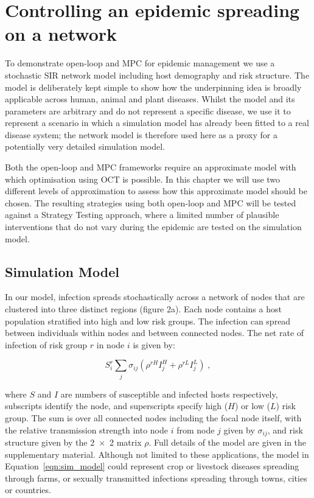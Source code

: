 \section{Controlling an epidemic spreading on a network}
\label{sec:ch4:Controlling}

To demonstrate open-loop and MPC for epidemic management we use a stochastic SIR network model including host demography and risk structure. The model is deliberately kept simple to show how the underpinning idea is broadly applicable across human, animal and plant diseases. Whilst the model and its parameters are arbitrary and do not represent a specific disease, we use it to represent a scenario in which a simulation model has already been fitted to a real disease system; the network model is therefore used here as a proxy for a potentially very detailed simulation model.

Both the open-loop and MPC frameworks require an approximate model with which optimisation using OCT is possible. In this chapter we will use two different levels of approximation to assess how this approximate model should be chosen. The resulting strategies using both open-loop and MPC will be tested against a Strategy Testing approach, where a limited number of plausible interventions that do not vary during the epidemic are tested on the simulation model. 

\subsection*{Simulation Model}

In our model, infection spreads stochastically across a network  of nodes that are clustered into three distinct regions (figure 2a). Each node contains a host population stratified into high and low risk groups. The infection can spread between individuals within nodes and between connected nodes. The net rate of infection of risk group $r$ in node $i$ is given by:
\begin{linenomath*}
    \begin{equation}
        S_i^r \sum_j \sigma_{ij} \left(\rho^{rH}I_j^H + \rho^{rL}I_j^L\right)\;,
    \label{eqn:sim_model}
    \end{equation}
\end{linenomath*}
where $S$ and $I$ are numbers of susceptible and infected hosts respectively, subscripts identify the node, and superscripts specify high ($H$) or low ($L$) risk group. The sum is over all connected nodes including the focal node itself, with the relative transmission strength into node $i$ from node $j$ given by $\sigma_{ij}$, and risk structure given by the \num{2x2} matrix $\rho$. Full details of the model are given in the supplementary material. Although not limited to these applications, the model in Equation~\ref{eqn:sim_model} could represent crop or livestock diseases spreading through farms, or sexually transmitted infections spreading through towns, cities or countries.

